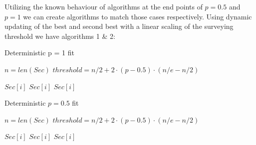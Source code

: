 \documentclass[a4paper,11pt]{article}
\begin{document}
Utilizing the known behaviour of algorithms at the end points of $p = 0.5$ and $p = 1$ we can create algorithms to match those cases respectively. Using dynamic updating of the best and second best with a linear scaling of the surveying threshold we have algorithms 1 \& 2: \\

\begin{algorithm}[H]
\caption{Deterministic p = 1 fit}
\begin{algorithmic}[1]

\State $n = len(Sec)$
\State $threshold = n/2 + 2 \cdot (p-0.5) \cdot (n/e - n/2)$

            \State \Return $Sec[i]$
            \State \Return $Sec[i]$
        \EndIf
    \EndFor
    \State \Return $Sec[i]$
\EndProcedure
\end{algorithmic}
\end{algorithm} 





\begin{algorithm}[H]
\caption{Deterministic $p = 0.5$ fit}
\begin{algorithmic}[1]

\State $n = len(Sec)$
\State $threshold = n/2 + 2 \cdot (p-0.5) \cdot (n/e - n/2)$

            \State \Return $Sec[i]$
            \State \Return $Sec[i]$
        \EndIf
    \EndFor
    \State \Return $Sec[i]$
\EndProcedure
\end{algorithmic}
\end{algorithm}
\end{document}
